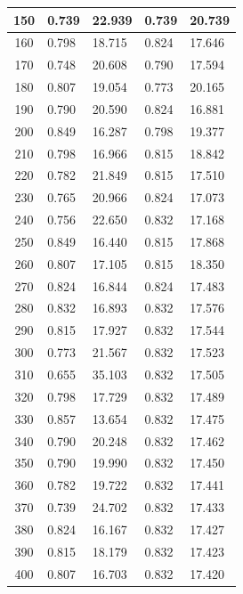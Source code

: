 \begin{longtable}{|c|l|l|l|l|}
        150 & 0.739 & 22.939 & 0.739 & 20.739 \\ \hline
        160 & 0.798 & 18.715 & 0.824 & 17.646 \\ \hline
        170 & 0.748 & 20.608 & 0.790 & 17.594 \\ \hline
        180 & 0.807 & 19.054 & 0.773 & 20.165 \\ \hline
        190 & 0.790 & 20.590 & 0.824 & 16.881 \\ \hline
        200 & 0.849 & 16.287 & 0.798 & 19.377 \\ \hline
        210 & 0.798 & 16.966 & 0.815 & 18.842 \\ \hline
        220 & 0.782 & 21.849 & 0.815 & 17.510 \\ \hline
        230 & 0.765 & 20.966 & 0.824 & 17.073 \\ \hline
        240 & 0.756 & 22.650 & 0.832 & 17.168 \\ \hline
        250 & 0.849 & 16.440 & 0.815 & 17.868 \\ \hline
        260 & 0.807 & 17.105 & 0.815 & 18.350 \\ \hline
        270 & 0.824 & 16.844 & 0.824 & 17.483 \\ \hline
        280 & 0.832 & 16.893 & 0.832 & 17.576 \\ \hline
        290 & 0.815 & 17.927 & 0.832 & 17.544 \\ \hline
        300 & 0.773 & 21.567 & 0.832 & 17.523 \\ \hline
        310 & 0.655 & 35.103 & 0.832 & 17.505 \\ \hline
        320 & 0.798 & 17.729 & 0.832 & 17.489 \\ \hline
        330 & 0.857 & 13.654 & 0.832 & 17.475 \\ \hline
        340 & 0.790 & 20.248 & 0.832 & 17.462 \\ \hline
        350 & 0.790 & 19.990 & 0.832 & 17.450 \\ \hline
        360 & 0.782 & 19.722 & 0.832 & 17.441 \\ \hline
        370 & 0.739 & 24.702 & 0.832 & 17.433 \\ \hline
        380 & 0.824 & 16.167 & 0.832 & 17.427 \\ \hline
        390 & 0.815 & 18.179 & 0.832 & 17.423 \\ \hline
        400 & 0.807 & 16.703 & 0.832 & 17.420 \\ \hline
    \end{longtable}

